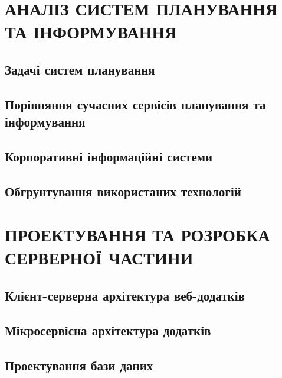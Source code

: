 \documentclass[a4paper,14pt]{extarticle} %
\begin{document}

\tableofcontents %
\clearpage


\section{АНАЛІЗ СИСТЕМ ПЛАНУВАННЯ ТА ІНФОРМУВАННЯ}
\subsection{Задачі систем планування} 

\subsection{Порівняння сучасних сервісів планування та інформування} 




\subsection{Корпоративні інформаційні системи} 



\subsection{Обгрунтування використаних технологій} 





\section{ПРОЕКТУВАННЯ ТА РОЗРОБКА СЕРВЕРНОЇ ЧАСТИНИ}

\subsection{Клієнт-серверна архітектура веб-додатків} 

\subsection{Мікросервісна архітектура додатків} 

\subsection{Проектування бази даних}





\end{document}

